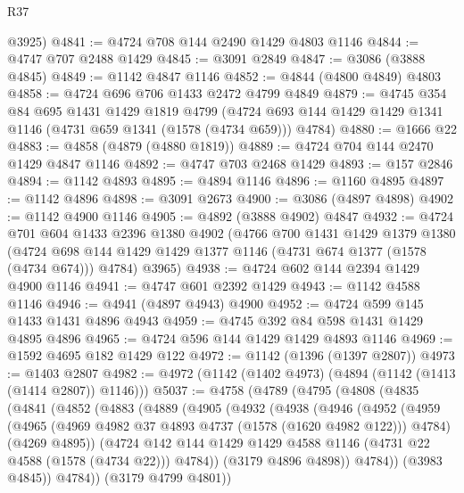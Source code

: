 \begin{lexlean}{R37}
\begin{coremodule}
      @3925)
@4841 := @4724 @708 @144 @2490 @1429 @4803 @1146
@4844 := @4747 @707 @2488 @1429
@4845 := @3091 @2849
@4847 := @3086 (@3888 @4845)
@4849 := @1142 @4847 @1146
@4852 := @4844 (@4800 @4849) @4803
@4858 := @4724 @696 @706 @1433 @2472 @4799 @4849
@4879 := @4745
    @354
    @84
    @695
    @1431
    @1429
    @1819
    @4799
    (@4724 @693 @144 @1429 @1429 @1341 @1146 (@4731 @659 @1341 (@1578 (@4734 @659))) @4784)
@4880 := @1666 @22
@4883 := @4858 (@4879 (@4880 @1819))
@4889 := @4724 @704 @144 @2470 @1429 @4847 @1146
@4892 := @4747 @703 @2468 @1429
@4893 := @157 @2846
@4894 := @1142 @4893
@4895 := @4894 @1146
@4896 := @1160 @4895
@4897 := @1142 @4896
@4898 := @3091 @2673
@4900 := @3086 (@4897 @4898)
@4902 := @1142 @4900 @1146
@4905 := @4892 (@3888 @4902) @4847
@4932 := @4724
    @701
    @604
    @1433
    @2396
    @1380
    @4902
    (@4766
      @700
      @1431
      @1429
      @1379
      @1380
      (@4724 @698 @144 @1429 @1429 @1377 @1146 (@4731 @674 @1377 (@1578 (@4734 @674))) @4784)
      @3965)
@4938 := @4724 @602 @144 @2394 @1429 @4900 @1146
@4941 := @4747 @601 @2392 @1429
@4943 := @1142 @4588 @1146
@4946 := @4941 (@4897 @4943) @4900
@4952 := @4724 @599 @145 @1433 @1431 @4896 @4943
@4959 := @4745 @392 @84 @598 @1431 @1429 @4895 @4896
@4965 := @4724 @596 @144 @1429 @1429 @4893 @1146
@4969 := @1592 @4695 @182 @1429 @122
@4972 := @1142 (@1396 (@1397 @2807))
@4973 := @1403 @2807
@4982 := @4972 (@1142 (@1402 @4973) (@4894 (@1142 (@1413 (@1414 @2807)) @1146)))
@5037 := @4758
    (@4789
      (@4795
        (@4808
          (@4835
            (@4841
              (@4852
                (@4883
                  (@4889
                    (@4905
                      (@4932
                        (@4938
                          (@4946
                            (@4952
                              (@4959
                                (@4965
                                  (@4969 @4982 @37 @4893 @4737 (@1578 (@1620 @4982 @122)))
                                  @4784)
                                (@4269 @4895))
                              (@4724
                                @142
                                @144
                                @1429
                                @1429
                                @4588
                                @1146
                                (@4731 @22 @4588 (@1578 (@4734 @22)))
                                @4784))
                            (@3179 @4896 @4898))
                          @4784))
                      (@3983 @4845))
                    @4784))
                (@3179 @4799 @4801))

\end{coremodule}
\end{lexlean}
